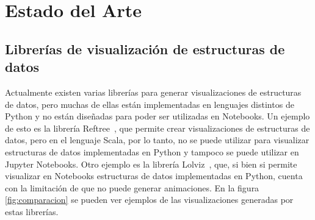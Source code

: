 \chapter{Estado del Arte}

\section{Librerías de visualización de estructuras de datos}

Actualmente existen varias librerías para generar visualizaciones de estructuras de datos, pero muchas de ellas están implementadas en lenguajes distintos de Python y no están diseñadas para poder ser utilizadas en Notebooks.
Un ejemplo de esto es la librería Reftree~\cite{Stanch2021}, que permite crear visualizaciones de estructuras de datos, pero en el lenguaje Scala, por lo tanto, no se puede utilizar para visualizar estructuras de datos implementadas en Python y tampoco se puede utilizar en Jupyter Notebooks.
Otro ejemplo es la librería Lolviz~\cite{Lolviz}, que, si bien si permite visualizar en Notebooks estructuras de datos implementadas en Python, cuenta con la limitación de que no puede generar animaciones. En la figura \ref{fig:comparacion} se pueden ver ejemplos de las visualizaciones generadas por estas librerías.

